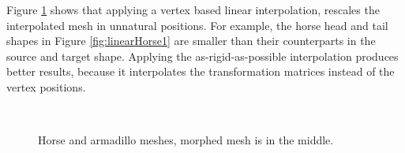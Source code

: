 \documentclass[12pt]{article}
\begin{document}
Figure \ref{fig:linearInterpolation} shows that applying a vertex based linear interpolation, rescales the interpolated mesh in unnatural positions.
For example, the horse head and tail shapes in Figure \ref{fig:linearHorse1} are smaller than their counterparts in the source and target shape.
Applying the as-rigid-as-possible interpolation produces better results, because it interpolates the transformation matrices instead of the vertex positions.

\begin{figure}
\\
\caption{Horse and armadillo meshes, morphed mesh is in the middle.}
\label{fig:linearInterpolation}
\end{figure}



\end{document}
